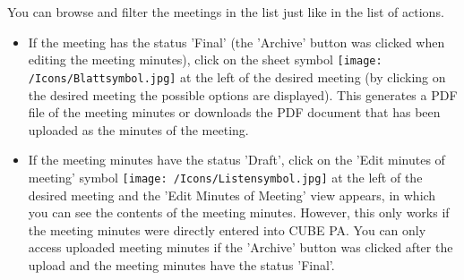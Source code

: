 You can browse and filter the meetings in the list just like in the list of actions.

\begin{itemize}
\item
If the meeting has the status 'Final' (the 'Archive' button was clicked when editing the meeting minutes), click on the sheet symbol \texttt{[image: /Icons/Blattsymbol.jpg]}  at the left of the desired meeting (by clicking on the desired meeting the possible options are displayed). This generates a PDF file of the meeting minutes or downloads the PDF document that has been uploaded as the minutes of the meeting.
\item
If the meeting minutes have the status 'Draft', click on the 'Edit minutes of meeting' symbol \texttt{[image: /Icons/Listensymbol.jpg]}  at the left of the desired meeting and the 'Edit Minutes of Meeting' view appears, in which you can see the contents of the meeting minutes. However, this only works if the meeting minutes were directly entered into CUBE PA. You can only access uploaded meeting minutes if the 'Archive' button was clicked after the upload and the meeting minutes have the status 'Final'.
\end{itemize}
